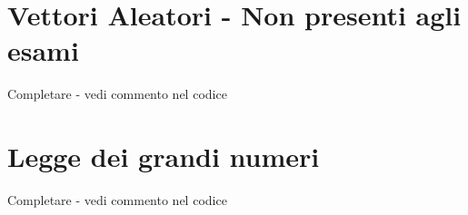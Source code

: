 \section*{Vettori Aleatori - Non presenti agli esami}
Completare - vedi commento nel codice
\section{Legge dei grandi numeri}
Completare - vedi commento nel codice

